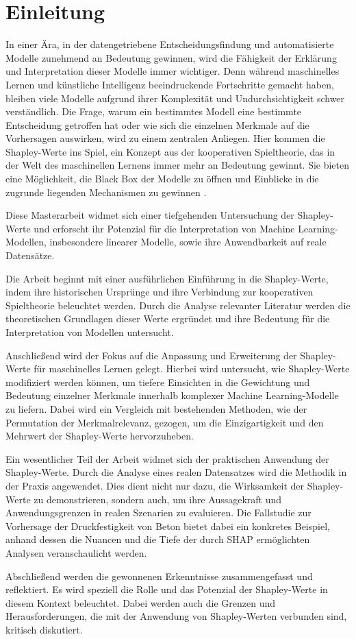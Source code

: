 \chapter{Einleitung}

In einer Ära, in der datengetriebene Entscheidungsfindung und automatisierte Modelle zunehmend an Bedeutung gewinnen,
wird die Fähigkeit der Erklärung und Interpretation dieser Modelle immer wichtiger. Denn während maschinelles Lernen und
künstliche Intelligenz beeindruckende Fortschritte gemacht haben, bleiben viele Modelle aufgrund ihrer Komplexität und Undurchsichtigkeit
schwer verständlich. Die Frage, warum ein bestimmtes Modell eine bestimmte Entscheidung getroffen hat oder wie sich die einzelnen
Merkmale auf die Vorhersagen auswirken, wird zu einem zentralen Anliegen. 
Hier kommen die Shapley-Werte ins Spiel, ein Konzept
aus der kooperativen Spieltheorie, das in der Welt des maschinellen Lernens immer mehr an Bedeutung gewinnt. Sie bieten eine
Möglichkeit, die \glqq{}Black Box\grqq{} der Modelle zu öffnen und Einblicke in die zugrunde liegenden Mechanismen zu gewinnen \cite[S. 3]{Molnar_2023}. 

Diese Masterarbeit widmet sich einer tiefgehenden Untersuchung der Shapley-Werte und erforscht ihr Potenzial für die Interpretation
von Machine Learning-Modellen, insbesondere linearer Modelle, sowie ihre Anwendbarkeit auf reale Datensätze.

Die Arbeit beginnt mit einer ausführlichen Einführung in die Shapley-Werte, indem ihre historischen Ursprünge 
und ihre Verbindung zur kooperativen Spieltheorie beleuchtet werden. Durch die Analyse relevanter Literatur 
werden die theoretischen Grundlagen dieser Werte ergründet und ihre Bedeutung für die Interpretation von Modellen untersucht.

Anschließend wird der Fokus auf die Anpassung und Erweiterung der Shapley-Werte für maschinelles Lernen gelegt. 
Hierbei wird untersucht, wie Shapley-Werte modifiziert werden können, um tiefere Einsichten in die Gewichtung 
und Bedeutung einzelner Merkmale innerhalb komplexer Machine Learning-Modelle zu liefern. Dabei wird ein Vergleich 
mit bestehenden Methoden, wie der Permutation der Merkmalrelevanz, gezogen, um die Einzigartigkeit und den Mehrwert der 
Shapley-Werte hervorzuheben.

Ein wesentlicher Teil der Arbeit widmet sich der praktischen Anwendung der Shapley-Werte. Durch die Analyse 
eines realen Datensatzes wird die Methodik in der Praxis angewendet. Dies dient nicht nur dazu, die Wirksamkeit 
der Shapley-Werte zu demonstrieren, sondern auch, um ihre Aussagekraft und Anwendungsgrenzen in realen Szenarien 
zu evaluieren. Die Fallstudie zur Vorhersage der Druckfestigkeit von Beton bietet dabei ein konkretes Beispiel, 
anhand dessen die Nuancen und die Tiefe der durch SHAP ermöglichten Analysen veranschaulicht werden.

Abschließend werden die gewonnenen Erkenntnisse zusammengefasst und reflektiert. Es wird speziell die Rolle und das 
Potenzial der Shapley-Werte in diesem Kontext beleuchtet. Dabei werden auch die Grenzen und Herausforderungen, 
die mit der Anwendung von Shapley-Werten verbunden sind, kritisch diskutiert. 